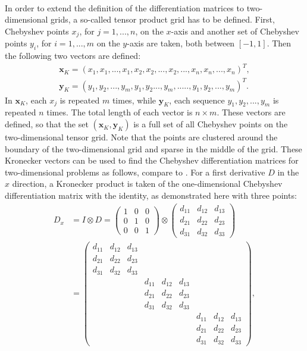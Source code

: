 \\
In order to extend the definition of the differentiation matrices to two-dimensional grids, a so-called tensor product grid has to be defined. First, Chebyshev points $x_j$, for $j=1,...,n$, on the $x$-axis and another set of Chebyshev points $y_i$, for $i=1,...,m$ on the $y$-axis are taken, both between $[-1,1]$. Then the following two vectors are defined:
\begin{align*}
\mathbf{x}_{K}=(x_1,x_1,...,x_1,x_2,x_2,...,x_2,...,x_n,x_n,...,x_n)^T,\\
\mathbf{y}_{K}=(y_1,y_2,...,y_m,y_1,y_2...,y_m,.....,y_1,y_2,...,y_m)^T.
\end{align*} 
In $\mathbf{x}_K$, each $x_j$ is repeated $m$ times, while $\mathbf{y}_K$, each sequence $y_1,y_2,...,y_m$ is repeated $n$ times. The total length of each vector is $n \times m$. 
These vectors are defined, so that the set $(\mathbf{x}_K,\mathbf{y}_K)$ is a full set of all Chebyshev points on the two-dimensional tensor grid.
Note that the points are clustered around the boundary of the two-dimensional grid and sparse in the middle of the grid.
These Kronecker vectors can be used to find the Chebyshev differentiation matrices for two-dimensional problems as follows, compare to \cite{bibTrefethen}. For a first derivative $D$ in the $x$ direction, a Kronecker product is taken of the one-dimensional Chebyshev differentiation matrix with the identity, as demonstrated here with three points:
\begin{align*}
D_x&=I \otimes D = 
\begin{pmatrix}
1 & 0 & 0\\
0 & 1 & 0 \\
0 & 0 & 1
\end{pmatrix}
\otimes
\begin{pmatrix}
d_{11} & d_{12} & d_{13}\\
d_{21} & d_{22} & d_{23} \\
d_{31} & d_{32} & d_{33}
\end{pmatrix}
\\&=
\begin{pmatrix}
d_{11} & d_{12} & d_{13} & & &  & & &\\
d_{21} & d_{22} & d_{23} & & & & & & \\
d_{31} & d_{32} & d_{33} & & & & & & \\
& & &d_{11} & d_{12} & d_{13} & & &\\
& & &d_{21} & d_{22} & d_{23}  & & &\\
& & &d_{31} & d_{32} & d_{33} & & &\\
 & & & & & &d_{11} & d_{12} & d_{13}\\
& & & & & &d_{21} & d_{22} & d_{23}  \\
& & & & & &d_{31} & d_{32} & d_{33} 
\end{pmatrix},
\end{align*}
